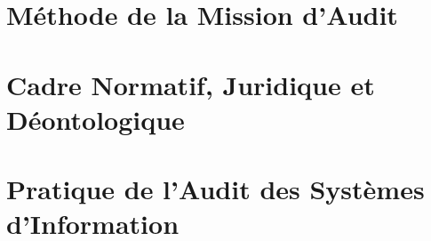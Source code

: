 \documentclass[12pt, twoside, openright, a4paper]{book}
\begin{document}
    \part{Méthode de la Mission d'Audit}
    \label{part:methode}

        
        
        
        
        

    \part{Cadre Normatif, Juridique et Déontologique}
    \label{part:normatif}

        
        
        

    \part{Pratique de l'Audit des Systèmes d'Information}
    \label{part:pratique}

        
        
        
        
        
        
\end{document}
